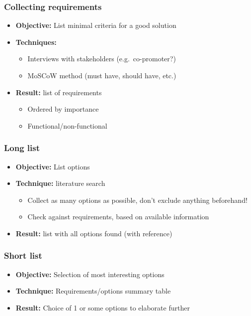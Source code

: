\documentclass[aspectratio=169]{beamer}
\begin{document}
\begin{frame}
  \frametitle{Collecting requirements}

  \begin{itemize}
      \item \textbf{Objective:} List minimal criteria for a good solution 
      \item \textbf{Techniques:}
      \begin{itemize}
          \item Interviews with stakeholders (e.g.\ co-promoter?)
          \item MoSCoW method (must have, should have, etc.)
      \end{itemize}
      \item \textbf{Result:} list of requirements
      \begin{itemize}
          \item Ordered by importance
          \item Functional/non-functional   
      \end{itemize}
  \end{itemize}

\end{frame}

\begin{frame}
  \frametitle{Long list}

  \begin{itemize}
    \item \textbf{Objective:} List options
    \item \textbf{Technique:} literature search
    \begin{itemize}
        \item Collect as many options as possible, don't exclude anything beforehand!
        \item Check against requirements, based on available information
    \end{itemize}
    \item \textbf{Result:} list with all options found (with reference)
  \end{itemize}

\end{frame}

\begin{frame}
  \frametitle{Short list}

  \begin{itemize}
   \item \textbf{Objective:} Selection of most interesting options
   \item \textbf{Technique:} Requirements/options summary table
   \item \textbf{Result:} Choice of 1 or some options to elaborate further
  \end{itemize}

\end{frame}
\end{document}
